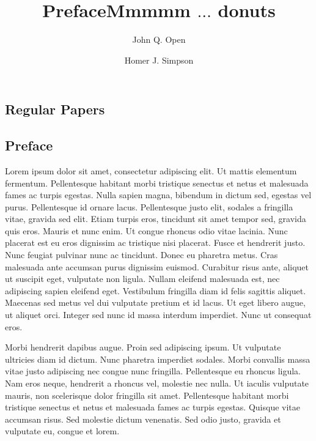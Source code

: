 \documentclass[a4paper,UKenglish]{lipicsmaster-v2016}
\begin{document}
\begin{contentslist}

\contitem
\title{Preface}
\author{John Q. Open}

\part{Regular Papers}

\contitem
\title{Mmmmm $\ldots$ donuts}
\author{Homer J. Simpson}


\end{contentslist}



\chapter{Preface} %

Lorem ipsum dolor sit amet, consectetur adipiscing elit. Ut mattis
elementum fermentum. Pellentesque habitant morbi tristique senectus et
netus et malesuada fames ac turpis egestas. Nulla sapien magna,
bibendum in dictum sed, egestas vel purus. Pellentesque id ornare
lacus. Pellentesque justo elit, sodales a fringilla vitae, gravida sed
elit. Etiam turpis eros, tincidunt sit amet tempor sed, gravida quis
eros. Mauris et nunc enim. Ut congue rhoncus odio vitae lacinia. Nunc
placerat est eu eros dignissim ac tristique nisi placerat. Fusce et
hendrerit justo. Nunc feugiat pulvinar nunc ac tincidunt. Donec eu
pharetra metus. Cras malesuada ante accumsan purus dignissim
euismod. Curabitur risus ante, aliquet ut suscipit eget, vulputate non
ligula. Nullam eleifend malesuada est, nec adipiscing sapien eleifend
eget. Vestibulum fringilla diam id felis sagittis aliquet. Maecenas
sed metus vel dui vulputate pretium et id lacus. Ut eget libero augue,
ut aliquet orci. Integer sed nunc id massa interdum imperdiet. Nunc ut
consequat eros.

Morbi hendrerit dapibus augue. Proin sed adipiscing ipsum. Ut
vulputate ultricies diam id dictum. Nunc pharetra imperdiet
sodales. Morbi convallis massa vitae justo adipiscing nec congue nunc
fringilla. Pellentesque eu rhoncus ligula. Nam eros neque, hendrerit a
rhoncus vel, molestie nec nulla. Ut iaculis vulputate mauris, non
scelerisque dolor fringilla sit amet. Pellentesque habitant morbi
tristique senectus et netus et malesuada fames ac turpis
egestas. Quisque vitae accumsan risus. Sed molestie dictum
venenatis. Sed odio justo, gravida et vulputate eu, congue et lorem. 
\end{document}
